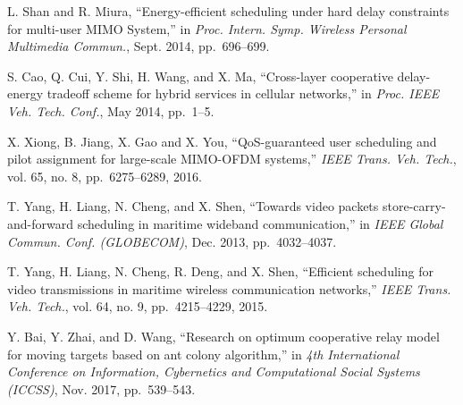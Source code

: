 \documentclass[conference]{IEEEtran}
\begin{document}
\begin{thebibliography}{10}
  L. Shan and R. Miura, ``Energy-efficient scheduling under hard delay constraints for multi-user MIMO System,'' in
  \emph{Proc. Intern. Symp. Wireless Personal Multimedia Commun.}, Sept. 2014, pp.~696--699.
  
  S. Cao, Q. Cui, Y. Shi, H. Wang, and X. Ma, ``Cross-layer cooperative delay-energy tradeoff scheme for hybrid services in cellular networks,'' in
  \emph{Proc. IEEE Veh. Tech. Conf.}, May 2014, pp.~1--5.
  
  X. Xiong, B. Jiang, X. Gao and X. You, ``QoS-guaranteed user scheduling and pilot assignment for large-scale MIMO-OFDM systems,''
  \emph{IEEE Trans. Veh. Tech.}, vol. 65, no. 8, pp.~6275--6289, 2016.
  
  
 
  T. Yang, H. Liang, N. Cheng, and X. Shen, 
  ``Towards video packets store-carry-and-forward scheduling in maritime wideband communication,'' in
  \emph{IEEE Global Commun. Conf. (GLOBECOM)}, Dec. 2013, pp.~4032--4037.
 
  T. Yang, H. Liang, N. Cheng, R. Deng, and X. Shen, ``Efficient scheduling for video transmissions in maritime wireless communication networks,'' 
  \emph{IEEE Trans. Veh. Tech.}, vol. 64, no. 9, pp.~4215--4229, 2015.
 
 
  Y. Bai, Y. Zhai, and D. Wang, 
  ``Research on optimum cooperative relay model for moving targets based on ant colony algorithm,'' in
  \emph{4th International Conference on Information, Cybernetics and Computational Social Systems (ICCSS)}, Nov. 2017, pp.~539--543.
 
 
 
 
 

\end{thebibliography}
\end{document}
